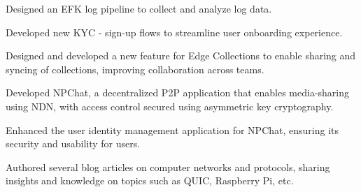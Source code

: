 \documentclass[letterpaper]{deedy-resume} %
\begin{document}
\begin{minipage}[t]{0.66\textwidth}
\begin{tightitemize}
\item Designed an EFK log pipeline to collect and analyze log data.
\item Developed new KYC - sign-up flows to streamline user onboarding experience.
\end{tightitemize}

\sectionspace %


\begin{tightitemize}
\item Designed and developed a new feature for Edge Collections to enable sharing and syncing of collections, improving collaboration across teams.
\end{tightitemize}

\sectionspace %

\begin{tightitemize}
\item Developed NPChat, a decentralized P2P application that enables media-sharing using NDN, with access control secured using asymmetric key cryptography.
\item Enhanced the user identity management application for NPChat, ensuring its security and usability for users.
\end{tightitemize}

\sectionspace %

Authored several blog articles on computer networks and protocols, sharing insights and knowledge on topics such as QUIC, Raspberry Pi, etc.


\end{minipage}
\end{document}
